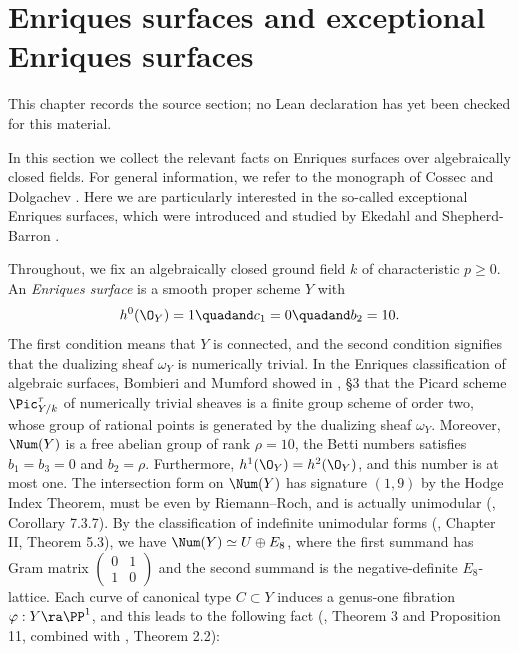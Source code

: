 \chapter{Enriques surfaces and exceptional Enriques surfaces}
\label{no-enriques-surface-over-the-integers-chapter-05}

\begin{remark}
\label{no-enriques-surface-over-the-integers-chapter-05-source}
This chapter records the source section; no Lean declaration has yet been checked for this material.
\notready
\end{remark}

\label{Enriques surfaces}

In this section we collect the relevant facts on Enriques surfaces over algebraically closed fields. For general information,
we refer to the monograph of Cossec and Dolgachev \cite{Cossec-Dolgachev-1989}. Here we
are particularly interested in the so-called exceptional Enriques surfaces, which were
introduced and studied by Ekedahl and Shepherd-Barron \cite{Ekedahl-Shepherd-Barron-2004}.

Throughout, we fix an algebraically closed ground field $k$ of characteristic $p\geq 0$.
An \emph{Enriques surface}  is a smooth proper  scheme $Y$ with
$$
h^0(\O_Y)=1\quadand  c_1=0\quadand b_2=10.
$$
The first condition means that $Y$ is connected, and  the second condition
 signifies that the dualizing sheaf $\omega_Y$ is numerically trivial.
In the Enriques classification of algebraic surfaces, Bombieri and Mumford  showed in  \cite{Bombieri-Mumford-1976}, \S 3    that
the   Picard scheme $\Pic^\tau_{Y/k}$ of numerically trivial sheaves is a finite group scheme
of order two, whose group of rational points is generated by the dualizing sheaf $\omega_Y$.
Moreover, $\Num(Y)$ is a  free abelian group of rank $\rho=10$, the Betti numbers satisfies $b_1=b_3=0$ and $b_2=\rho$.
Furthermore, $h^1(\O_Y)=h^2(\O_Y)$, and this number is at most one.
The intersection form on $\Num(Y)$  has signature $(1,9)$ by the Hodge Index Theorem, must be  even by Riemann--Roch, and is actually
unimodular (\cite{Illusie-1979}, Corollary 7.3.7). By the classification of indefinite unimodular forms (\cite{Milnor-Husemoller-1973}, Chapter II, Theorem 5.3),
we have $\Num(Y)\simeq U\oplus E_8$, where the first summand has Gram matrix
$(\begin{smallmatrix}0&1\\1&0\end{smallmatrix})$  and the second summand is the negative-definite $E_8$-lattice.
Each curve of canonical type $C\subset Y$ induces a genus-one fibration $\varphi:Y\ra\PP^1$, and
this  leads to the following fact (\cite{Bombieri-Mumford-1977}, Theorem 3 and Proposition 11, combined with
 \cite{Lang-1983}, Theorem 2.2):

